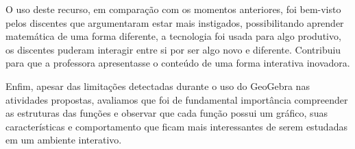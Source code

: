 \begin{refsection}
    O uso deste recurso, em comparação com os momentos anteriores, foi bem-visto pelos discentes que argumentaram estar mais instigados, possibilitando aprender matemática de uma forma diferente, a tecnologia foi usada para algo produtivo, os discentes puderam interagir entre si por ser algo novo e diferente. Contribuiu para que a professora apresentasse o conteúdo de uma forma interativa inovadora. 

    Enfim, apesar das limitações detectadas durante o uso do GeoGebra nas atividades propostas, avaliamos que foi de fundamental importância compreender as estruturas das funções e observar que cada função possui um gráfico, suas características e comportamento que ficam mais interessantes de serem estudadas em um ambiente interativo. 

    \printbibliography[heading=subbibliography,notcategory=fullcited]

    \nocite{DocumentoInstitucional2006Orientações}
    \nocite{DocumentoInstitucional2017Escola}

    \label{chap:contrib-geogebraend}

\end{refsection}
